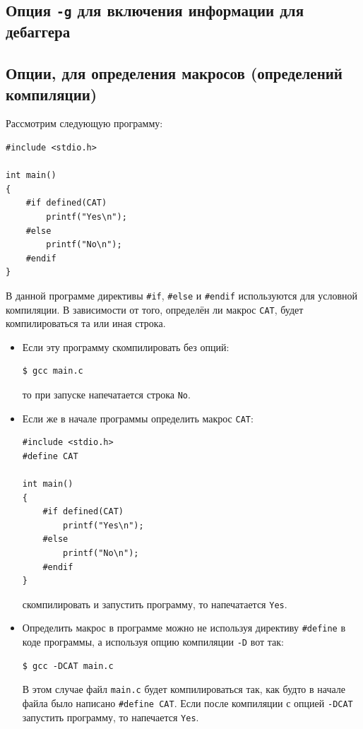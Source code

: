 \documentclass{article}
\begin{document}
\subsection*{Опция \texttt{-g} для включения информации для дебаггера}



\subsection*{Опции, для определения макросов (определений компиляции)}
Рассмотрим следующую программу:
\begin{lstlisting}[style=csMiptCppStyle]
#include <stdio.h>

int main()
{
    #if defined(CAT)
        printf("Yes\n");
    #else
        printf("No\n");
    #endif
}
\end{lstlisting}
В данной программе директивы \texttt{\#if}, \texttt{\#else} и \texttt{\#endif} используются для условной компиляции. В зависимости от того, определён ли макрос \texttt{CAT}, будет компилироваться та или иная строка. 
\begin{itemize}
\item Если эту программу скомпилировать без опций:
\begin{lstlisting}[style=csMiptBash]
$ gcc main.c
\end{lstlisting}
то при запуске напечатается строка \texttt{No}. 

\item Если же в начале программы определить макрос \texttt{CAT}:
\begin{lstlisting}[style=csMiptCppStyle]
#include <stdio.h>
#define CAT

int main()
{
    #if defined(CAT)
        printf("Yes\n");
    #else
        printf("No\n");
    #endif
}
\end{lstlisting}
скомпилировать и запустить программу, то напечатается \texttt{Yes}.

\item Определить макрос в программе можно не используя директиву \texttt{\#define} в коде программы, а используя опцию компиляции \texttt{-D} вот так:
\begin{lstlisting}[style=csMiptBash]
$ gcc -DCAT main.c
\end{lstlisting}
В этом случае файл \texttt{main.c} будет компилироваться так, как будто в начале файла было написано \texttt{\#define CAT}. Если после компиляции с опцией \texttt{-DCAT} запустить программу, то напечается \texttt{Yes}.
\end{itemize}
\end{document}

